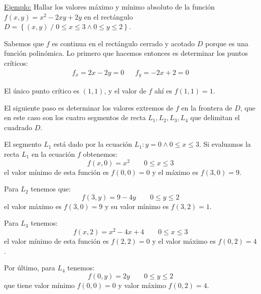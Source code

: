 \documentclass[12pt]{article}
\begin{document}
\underline{Ejemplo:} Hallar los valores máximo y mínimo absoluto de la función $ f(x,y)=x^2-2xy+2y $ en el rectángulo $ D=\left\{(x,y) \;/\; 0 \leq x \leq 3  \land 0 \leq y \leq 2\right\} $.

Sabemos que $ f $ es continua en el rectángulo cerrado y acotado $ D $ porque es una función polinómica. Lo primero que hacemos entonces es determinar los puntos críticos:
\begin{align*}
  f_{x}=2x-2y = 0 && f_{y}=-2x+2 = 0
\end{align*}

El único punto crítico es $ (1,1) $, y el valor de $ f $ ahí es $ f(1,1)=1 $.

El siguiente paso es determinar los valores extremos de $ f $ en la frontera de $ D $, que en este caso son los cuatro segmentos de recta $ L_{1},L_{2},L_{3},L_{4} $ que delimitan el cuadrado $ D $.

\begin{center}
\end{center}

El segmento $ L_{1} $ está dado por la ecuación $ L_{1}:y=0  \land 0\leq x\leq 3 $. Si evaluamos la recta $ L_{1} $ en la ecuación $ f $ obtenemos:
\[
  f(x,0)=x^2 \qquad 0\leq x\leq 3
\]
el valor mínimo de esta función es $ f(0,0)=0 $ y el máximo es $ f(3,0)=9 $.

Para $ L_{2} $ tenemos que:
\[
  f(3,y)=9-4y \qquad 0\leq y\leq 2
\]
el valor máximo es $ f(3,0)=9 $ y su valor mínimo es $ f(3,2)=1 $.

Para $ L_{3} $ tenemos:
\[
  f(x,2)=x^2-4x+4 \qquad 0\leq x\leq 3
\]
el valor mínimo de esta función es $ f(2,2)=0 $ y el valor máximo es $ f(0,2)=4 $. 

Por último, para $ L_{4} $ tenemos:
\[
  f(0,y)=2y \qquad 0\leq y\leq 2
\]
que tiene valor mínimo $ f(0,0)=0 $ y valor máximo $ f(0,2)=4 $. 
\end{document}
